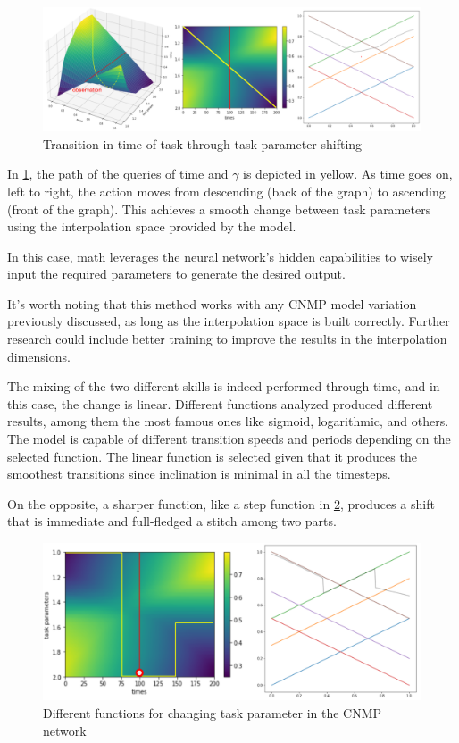 \begin{figure}
    \centering
    \includegraphics[width=0.95\linewidth]{figures/tpshift.png}
    \caption{ Transition in time of task through task parameter shifting }
    \label{fig:tpshift}
\end{figure}

In \cref{fig:tpshift}, the path of the queries of time and $\gamma$ is depicted in yellow. As time goes on, left to right, the action moves from descending (back of the graph) to ascending (front of the graph). This achieves a smooth change between task parameters using the interpolation space provided by the model. 

In this case, math leverages the neural network's hidden capabilities to wisely input the required parameters to generate the desired output. 

It's worth noting that this method works with any CNMP model variation previously discussed, as long as the interpolation space is built correctly. Further research could include better training to improve the results in the interpolation dimensions.  

The mixing of the two different skills is indeed performed through time, and in this case, the change is linear. Different functions analyzed produced different results, among them the most famous ones like sigmoid, logarithmic, and others. The model is capable of different transition speeds and periods depending on the selected function. The linear function is selected given that it produces the smoothest transitions since inclination is minimal in all the timesteps. 

On the opposite, a sharper function, like a step function in \cref{fig:tpshift-diff-functions}, produces a shift that is immediate and full-fledged a stitch among two parts. 

\begin{figure}
    \centering
    \includegraphics[width=0.8\linewidth]{figures/tpshift-diff-functions.png}
    \caption{ Different functions for changing task parameter in the CNMP network }
    \label{fig:tpshift-diff-functions}
\end{figure}

